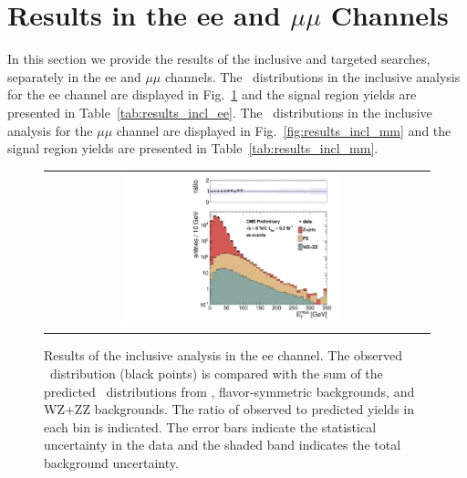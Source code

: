 \clearpage

\section{Results in the ee and $\mu\mu$ Channels}
\label{app:results}

In this section we provide the results of the inclusive and targeted searches, separately in the ee and $\mu\mu$ channels.
The \MET\ distributions in the inclusive analysis for the ee channel are displayed in Fig.~\ref{fig:results_incl_ee} and 
the signal region yields are presented in Table~\ref{tab:results_incl_ee}.
The \MET\ distributions in the inclusive analysis for the $\mu\mu$ channel are displayed in Fig.~\ref{fig:results_incl_mm} and 
the signal region yields are presented in Table~\ref{tab:results_incl_mm}.

\begin{figure}[!h]
\begin{center}
\begin{tabular}{cc}
\includegraphics[width=0.6\textwidth]{plots/pfmet_ee_92fb.pdf}
\end{tabular}
\caption{Results of the inclusive analysis in the ee channel. The observed \MET\ distribution (black points) is compared with the sum of the predicted \MET\
distributions from \zjets, flavor-symmetric backgrounds, and WZ+ZZ backgrounds. The ratio of observed to predicted yields in each bin is
indicated. The error bars indicate the statistical uncertainty in the data and the shaded band indicates the total background uncertainty.
\label{fig:results_incl_ee}
}
\end{center}
\end{figure}


